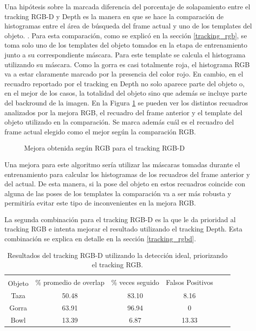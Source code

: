 Una hipótesis sobre la marcada diferencia del porcentaje de solapamiento entre el tracking RGB-D y Depth es la manera en que se hace la comparación de histogramas entre el área de búsqueda del frame actual y uno de los templates del objeto. . Para esta comparación, como se explicó en la sección \ref{tracking_rgb}, se toma solo uno de los templates del objeto tomados en la etapa de entrenamiento junto a su correspondiente máscara. Para este template se calcula el histograma utilizando su máscara. Como la gorra es casi totalmente roja, el histograma RGB va a estar claramente marcado por la presencia del color rojo. En cambio, en el recuadro reportado por el tracking en Depth no solo aparece parte del objeto o, en el mejor de los casos, la totalidad del objeto sino que además se incluye parte del backround de la imagen. En la Figura \ref{mejora_rgb_en_tracking_rgbd} se pueden ver los distintos recuadros analizados por la mejora RGB, el recuadro del frame anterior y el template del objeto utilizado en la comparación. Se marca además cuál es el recuadro del frame actual elegido como el mejor según la comparación RGB. 

\begin{figure}
	\caption{Mejora obtenida según RGB para el tracking RGB-D}
	\label{mejora_rgb_en_tracking_rgbd}
\end{figure}

Una mejora para este algoritmo sería utilizar las máscaras tomadas durante el entrenamiento para calcular los histogramas de los recuadros del frame anterior y del actual. De esta manera, si la pose del objeto en estos recuadros coincide con alguna de las poses de los templates la comparación va a ser más robusta y permitiría evitar este tipo de inconvenientes en la mejora RGB.

La segunda combinación para el tracking RGB-D es la que le da prioridad al tracking RGB e intenta mejorar el resultado utilizando el tracking Depth. Esta combinación se explica en detalle en la sección \ref{tracking_rgbd}.

\begin{table}[h]
    \begin{tabular}{|c|c|c|c|c|c|}
    \hline
    & \multirow{2}{2.4cm}{\% promedio de overlap} & \multirow{2}{2cm}{\% veces seguido} & \multirow{2}{1.6cm}{Falsos Positivos}\\
	Objeto & & &\\
    \hline
    Taza   & 50.48      & 83.10             & 8.16  \\
    \hline
    Gorra  & 63.91      & 96.94             & 0     \\
    \hline
    Bowl   & 13.39      &  6.87             & 13.33 \\
    \hline
    \end{tabular}
\caption{Resultados del tracking RGB-D utilizando la detección ideal, priorizando el tracking RGB.}
\label{tabla_rgbd_rgb}
\end{table}


